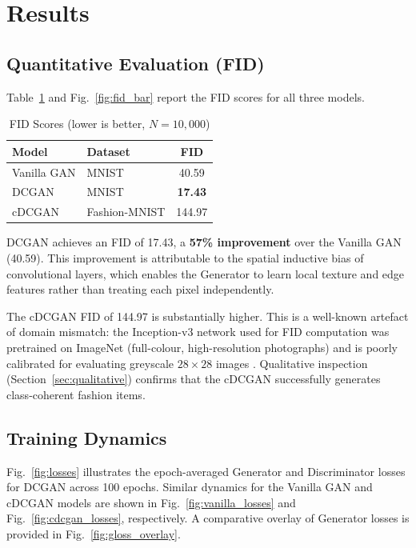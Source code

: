 \documentclass[conference]{IEEEtran}
\begin{document}
\section{Results}
\label{sec:results}

\subsection{Quantitative Evaluation (FID)}
Table~\ref{tab:fid} and Fig.~\ref{fig:fid_bar} report the FID scores for all three models.

\begin{table}[H]
\centering
\caption{FID Scores (lower is better, $N=10{,}000$)}
\label{tab:fid}
\begin{tabular}{llc}
\toprule
\textbf{Model} & \textbf{Dataset} & \textbf{FID} \\
\midrule
Vanilla GAN & MNIST & 40.59 \\
DCGAN       & MNIST & \textbf{17.43} \\
cDCGAN      & Fashion-MNIST & 144.97 \\
\bottomrule
\end{tabular}
\end{table}

DCGAN achieves an FID of 17.43, a \textbf{57\% improvement} over the Vanilla GAN (40.59). This improvement is attributable to the spatial inductive bias of convolutional layers, which enables the Generator to learn local texture and edge features rather than treating each pixel independently.

The cDCGAN FID of 144.97 is substantially higher. This is a well-known artefact of domain mismatch: the Inception-v3 network used for FID computation was pretrained on ImageNet (full-colour, high-resolution photographs) and is poorly calibrated for evaluating greyscale $28\times28$ images \cite{heusel2017fid}. Qualitative inspection (Section~\ref{sec:qualitative}) confirms that the cDCGAN successfully generates class-coherent fashion items.

\subsection{Training Dynamics}
\label{sec:dynamics}

Fig.~\ref{fig:losses} illustrates the epoch-averaged Generator and Discriminator losses for DCGAN across 100 epochs. Similar dynamics for the Vanilla GAN and cDCGAN models are shown in Fig.~\ref{fig:vanilla_losses} and Fig.~\ref{fig:cdcgan_losses}, respectively. A comparative overlay of Generator losses is provided in Fig.~\ref{fig:gloss_overlay}.
\end{document}
